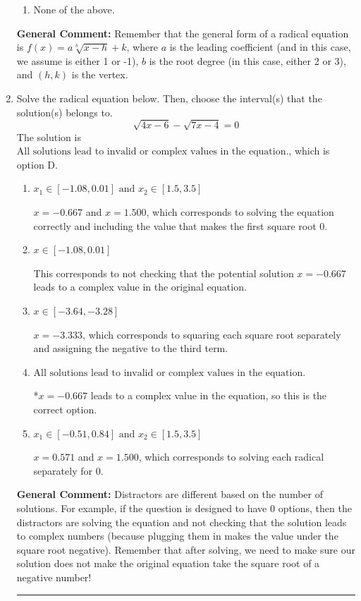 \documentclass{extbook}[14pt]
\newcommand{\litem}[1]{\item #1

\rule{\textwidth}{0.4pt}}
\begin{document}
\begin{enumerate}
{\begin{enumerate}[label=\Alph*.]
\item None of the above.\end{enumerate}
\textbf{General Comment:} Remember that the general form of a radical equation is $ f(x) = a \sqrt[b]{x - h} + k $, where $a$ is the leading coefficient (and in this case, we assume is either 1 or -1), $b$ is the root degree (in this case, either 2 or 3), and $(h, k)$ is the vertex.
}
\litem{
Solve the radical equation below. Then, choose the interval(s) that the solution(s) belongs to.
\[ \sqrt{4 x - 6} - \sqrt{7 x - 4} = 0 \]The solution is \( \text{All solutions lead to invalid or complex values in the equation.} \), which is option D.\begin{enumerate}[label=\Alph*.]
\item \( x_1 \in [-1.08, 0.01] \text{ and } x_2 \in [1.5,3.5] \)

$x = -0.667$ and $x = 1.500$, which corresponds to solving the equation correctly and including the value that makes the first square root 0.
\item \( x \in [-1.08,0.01] \)

This corresponds to not checking that the potential solution $x = -0.667$ leads to a complex value in the original equation.
\item \( x \in [-3.64,-3.28] \)

$x = -3.333$, which corresponds to squaring each square root separately and assigning the negative to the third term.
\item \( \text{All solutions lead to invalid or complex values in the equation.} \)

*$x = -0.667$ leads to a complex value in the equation, so this is the correct option.
\item \( x_1 \in [-0.51, 0.84] \text{ and } x_2 \in [1.5,3.5] \)

$x = 0.571$ and $x = 1.500$, which corresponds to solving each radical separately for 0.
\end{enumerate}

\textbf{General Comment:} Distractors are different based on the number of solutions. For example, if the question is designed to have 0 options, then the distractors are solving the equation and not checking that the solution leads to complex numbers (because plugging them in makes the value under the square root negative). Remember that after solving, we need to make sure our solution does not make the original equation take the square root of a negative number!
}
\end{enumerate}
\end{document}
